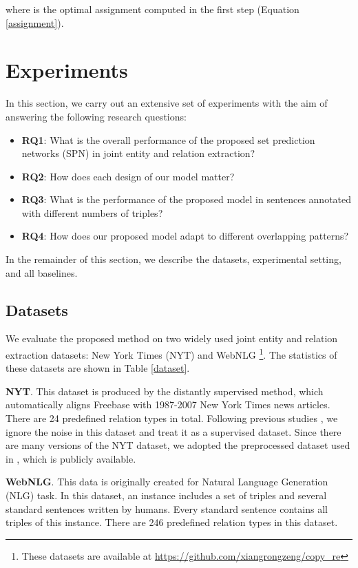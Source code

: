 \documentclass[letterpaper]{article} \usepackage{aaai21}  \usepackage{times}  \usepackage{helvet} \usepackage{courier}  \usepackage[hyphens]{url}  \usepackage{graphicx} \usepackage{amsfonts,amssymb}
\begin{document}
where  is the optimal assignment computed in the first step  (Equation \ref{assignment}).
\section{Experiments}
In this section, we carry out an extensive set of experiments with the aim of answering the following research questions: 
\begin{itemize}
    \item  \textbf{RQ1}: What is the overall performance of the proposed set prediction networks (SPN) in joint entity and relation extraction?
    \item \textbf{RQ2}: How does each design of our model matter? 
    \item \textbf{RQ3}: What is the performance of the proposed model in sentences annotated with different numbers of triples?
    \item \textbf{RQ4}: How does our proposed model adapt to different overlapping patterns?
\end{itemize}
In the remainder of this section, we describe the datasets, experimental setting, and all baselines.

\subsection{Datasets}
We evaluate the proposed method on two widely used joint entity and relation extraction datasets: New York Times (NYT) \cite{riedel2010modeling} and WebNLG \cite{gardent2017creating} \footnote{These datasets are available at \url{https://github.com/xiangrongzeng/copy_re}}. The statistics of these datasets are shown in Table \ref{dataset}.

\textbf{NYT}. This dataset is produced by the distantly supervised method, which automatically aligns Freebase with 1987-2007 New York Times news articles. There are 24 predefined relation types in total. Following previous studies \cite{zheng2017joint,zeng2018extracting}, we ignore the noise in this dataset and treat it as a supervised dataset. Since there are many versions of the NYT dataset, we adopted the preprocessed dataset used in \citet{zeng2018extracting}, which is publicly available. 

\textbf{WebNLG}. This data is originally created for Natural Language Generation (NLG) task. In this dataset, an instance includes a set of triples and several standard sentences written by humans. Every standard sentence contains all triples of this instance. There are 246 predefined relation types in this dataset. 
\end{document}
